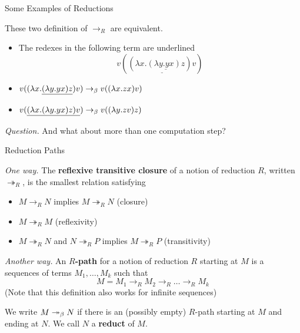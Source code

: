 \documentclass[10pt]{beamer}
\begin{document}
\begin{frame}{Some Examples of Reductions}

\begin{lemma}
These two definition of $\to_R$ are equivalent.
\end{lemma}
\nxt

\begin{example}
\begin{itemize}
\item The redexes in the following term are underlined
\begin{displaymath}
v(\underline{(\lambda x . \underline{(\lambda y . yx)z}) v})
\end{displaymath}
\item $v((\lambda x . \underline{(\lambda y . yx)z}) v) \rightarrow_\beta v((\lambda x . zx) v)$
\item $v(\underline{(\lambda x . (\lambda y . yx)z) v}) \rightarrow_\beta v((\lambda y . zv)z)$
\end{itemize}
\end{example}
\nxt

\textit{Question.} And what about more than one computation step?
\end{frame}

\begin{frame}{Reduction Paths}

\textit{One way.}
The \textbf{reflexive transitive closure} of a notion of reduction $R$, written $\twoheadrightarrow_R$, is the smallest relation satisfying
\begin{itemize}
\item $M \to_R N$ implies $M \twoheadrightarrow_R N$ (closure)
\item $M \twoheadrightarrow_R M$ (reflexivity)
\item $M \twoheadrightarrow_R N$ and $N \twoheadrightarrow_R P$ implies $M \twoheadrightarrow_R P$ (transitivity)
\end{itemize}
\nxt

\textit{Another way.}
An \textbf{$R$-path} for a notion of reduction $R$ starting at $M$ is a sequences of terms $M_1, \dots, M_k$ such that
\begin{displaymath}
M = M_1 \to_R M_2 \to_R \dots \to_R M_k
\end{displaymath}
(Note that this definition also works for infinite sequences)
\vfill

We write $M \twoheadrightarrow_\beta N$ if there is an (possibly empty) $R$-path starting at $M$ and ending at $N$.
We call $N$ a \textbf{reduct} of $M$.
\end{frame}
\end{document}
